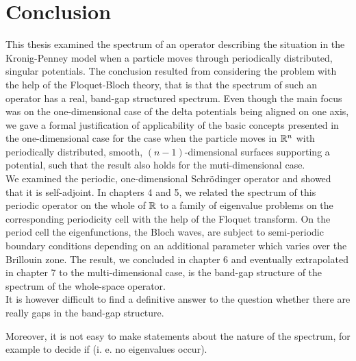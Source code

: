 \chapter{Conclusion} \label{chap:8}
	
This thesis examined the spectrum of an operator describing the situation in the Kronig-Penney model when a particle moves through periodically distributed, singular potentials. The conclusion resulted from considering the problem with the help of the Floquet-Bloch theory, that is that the spectrum of such an operator has a real, band-gap structured spectrum. Even though the main focus was on the one-dimensional case of the delta potentials being aligned on one axis, we gave a formal justification of applicability of the basic concepts presented in the one-dimensional case for the case when the particle moves in $\mathbb{R}^{n}$ with periodically distributed, smooth, $(n-1)$-dimensional surfaces supporting a potential, such that the result also holds for the muti-dimensional case. 
~\\

We examined the periodic, one-dimensional Schrödinger operator and showed that it is self-adjoint. In chapters 4 and 5, we related the spectrum of this periodic operator on the whole of $\mathbb{R}$ to a family of eigenvalue problems on the corresponding periodicity cell with the help of the Floquet transform. On the period cell the eigenfunctions, the Bloch waves, are subject to semi-periodic boundary conditions depending on an additional parameter which varies over the Brillouin zone. The result, we concluded in chapter 6 and eventually extrapolated in chapter 7 to the multi-dimensional case, is the band-gap structure of the spectrum of the whole-space operator.
~\\

It is however difficult to find a definitive answer to the question whether there are really gaps in the band-gap structure.


 Moreover, it is not easy to make statements about the nature of the spectrum, for example to decide if (i. e. no eigenvalues occur).

